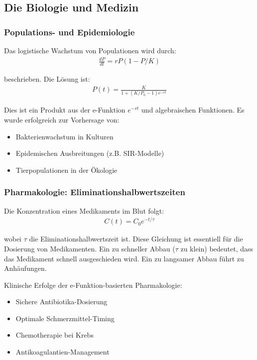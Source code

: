 \documentclass[a4paper,12pt,twoside]{report}
\theoremstyle{definition}
\begin{document}
\subsection{Die Biologie und Medizin}

\subsubsection*{Populations- und Epidemiologie}

Das logistische Wachstum von Populationen wird durch:
\begin{align}
	\frac{dP}{dt} = r P (1 - P/K)
\end{align}

beschrieben. Die Lösung ist:
\begin{align}
	P(t) = \frac{K}{1 + (K/P_0 - 1) e^{-rt}}
\end{align}

Dies ist ein Produkt aus der e-Funktion $e^{-rt}$ und algebraischen Funktionen. Es wurde erfolgreich zur Vorhersage von:
\begin{itemize}
	\item[-] Bakterienwachstum in Kulturen
	\item[-] Epidemischen Ausbreitungen (z.B. SIR-Modelle)
	\item[-] Tierpopulationen in der Ökologie
\end{itemize}

\subsubsection*{Pharmakologie: Eliminationshalbwertszeiten}

Die Konzentration eines Medikaments im Blut folgt:
\begin{align}
	C(t) = C_0 e^{-t/\tau}
\end{align}

wobei $\tau$ die Eliminationshalbwertszeit ist. Diese Gleichung ist essentiell für die Dosierung von Medikamenten. Ein zu schneller Abbau ($\tau$ zu klein) bedeutet, dass das Medikament schnell ausgeschieden wird. Ein zu langsamer Abbau führt zu Anhäufungen.

Klinische Erfolge der e-Funktion-basierten Pharmakologie:
\begin{itemize}
	\item[-] Sichere Antibiotika-Dosierung
	\item[-] Optimale Schmerzmittel-Timing
	\item[-] Chemotherapie bei Krebs
	\item[-] Antikoagulantien-Management
\end{itemize}
\end{document}
